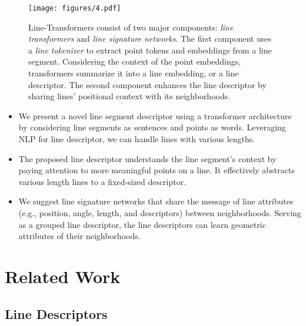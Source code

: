 \documentclass[letterpaper, 10 pt, journal, twoside]{ieeetran}
\begin{document}
\begin{figure*}[!t]
	\centering
	\texttt{[image: figures/4.pdf]}
	\caption{Line-Transformers consist of two major components: \textit{line transformers} and \textit{line signature networks}. The first component uses a \textit{line tokenizer} to extract point tokens and embeddings from a line segment. Considering the context of the point embeddings, transformers summarize it into a line embedding, or a line descriptor. The second component enhances the line descriptor by sharing lines' positional context with its neighborhoods.}
	\label{fig:overview}
	\vspace{-5mm}
\end{figure*}


\begin{itemize}
\item We present a novel line segment descriptor using a transformer architecture by considering line segments as sentences and points as words. Leveraging \ac{NLP} for line descriptor, we can handle lines with various lengths.

	\item The proposed line descriptor understands the line segment's context by paying attention to more meaningful points on a line. It effectively abstracts various length lines to a fixed-sized descriptor.

	\item We suggest line signature networks that share the message of line attributes (e.g., position, angle, length, and descriptors) between neighborhoods. Serving as a grouped line descriptor, the line descriptors can learn geometric attributes of their neighborhoods.

\end{itemize}
\section{Related Work}
\label{sec:related_work}

\subsection{Line Descriptors}
\end{document}
